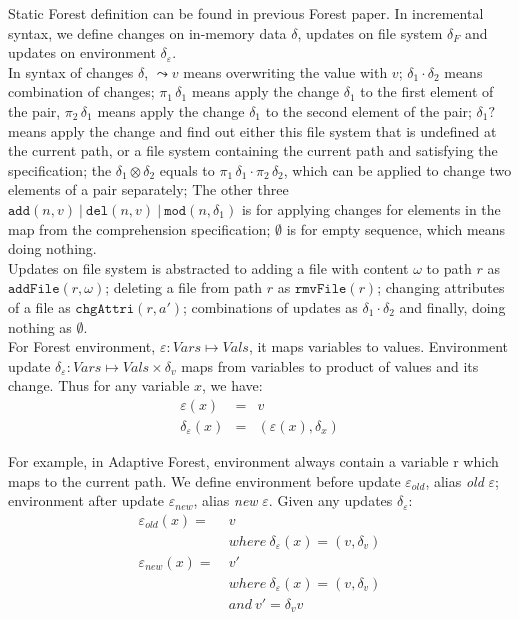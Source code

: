 \documentclass[10pt,twoside,a4paper]{article}
\theoremstyle{theorem}
\theoremstyle{lemma}
\theoremstyle{property}
\theoremstyle{definition}
\theoremstyle{assumption}
\def\fst{\pi_1}
\def\snd{\pi_2}
\begin{document}
Static Forest definition can be found in previous Forest paper. In incremental syntax, we define changes on in-memory data $\delta$, updates on file system $\delta_F$ and updates on environment $\delta_\varepsilon$. \\

In syntax of changes $\delta$, $\leadsto v$ means overwriting the value with $v$; 
$\delta_1 \cdot \delta_2$ means combination of changes; 
$\fst\,\delta_1$ means apply the change $\delta_1$ to the first element of the pair, $\snd\,\delta_1$ means apply the change $\delta_1$ to the second element of the pair; 
$\delta_1?$ means apply the change and find out either this file system that is undefined at the current path, or a file system containing the current path and satisfying the specification; 
the $\delta_1 \otimes \delta_2$ equals to $\fst\,\delta_1 \cdot \snd\,\delta_2$, which can be applied to change two elements of a pair separately; 
The other three $\mathtt{add}(n, v) ~|~ \mathtt{del}(n, v) ~|~ \mathtt{mod}(n, \delta_1)$ is for applying changes for elements in the map from the comprehension specification; 
$\emptyset$ is for empty sequence, which means doing nothing. \\

Updates on file system is abstracted to adding a file with content $\omega$ to path $r$ as $\mathtt{addFile}(r,\omega)$; deleting a file from path $r$ as $\mathtt{rmvFile}(r)$; changing attributes of a file as $\mathtt{chgAttri}(r,a')$; combinations of updates as $\delta_1 \cdot \delta_2$ and finally, doing nothing as $\emptyset$.\\

For Forest environment, $\varepsilon: V\!ars \mapsto V\!als$, it maps variables to values. Environment update $\delta_\varepsilon: V\!ars \mapsto V\!als \times \delta_v$ maps from variables to product of values and its change. Thus for any variable $x$, we have:
\begin{eqnarray*}
	\varepsilon (x) &=& v\\
	\delta_\varepsilon (x) &=& (\varepsilon(x), \delta_x)
\end{eqnarray*}

For example, in Adaptive Forest, environment always contain a variable r which maps to the current path. We define environment before update $\varepsilon_{old}$, alias \emph{old} $\varepsilon$; environment after update $\varepsilon_{new}$, alias \emph{new} $\varepsilon$. Given any updates $\delta_\varepsilon$:
\begin{align*}
	\varepsilon_{old}(x) =& ~v\\
						  & ~where ~\delta_\varepsilon (x) = (v, \delta_v)\\
	\varepsilon_{new}(x) =& ~v'\\
						  & ~where ~\delta_\varepsilon (x) = (v, \delta_v)\\
						  & ~and ~v' = \delta_v v
\end{align*}
\end{document}
